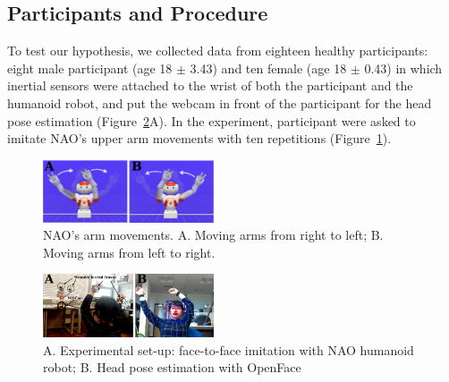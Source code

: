 \documentclass{sigchi}
\begin{document}
\subsection{Participants and Procedure}
To test our hypothesis, we collected data from eighteen healthy participants:
eight male participant (age 18 $\pm$ 3.43) and ten female (age 18 $\pm$ 0.43)
in which inertial sensors were attached to the wrist of both the participant and the
humanoid robot, and put the webcam in front of the participant for the head pose
estimation (Figure~\ref{fig:exp}A).
In the experiment, participant were asked to imitate NAO's upper arm movements
with ten repetitions (Figure~\ref{fig:nao}).
\begin{figure}
\centering
\includegraphics[width=0.45\textwidth]{figures/nao/arm_movements/fignao}
\caption[PA]{NAO's arm movements. A. Moving arms from right to left;
B. Moving arms from left to right.  }
\label{fig:nao}
\end{figure}
\begin{figure}
\centering
\includegraphics[width=0.45\textwidth]{figures/experiment/fig_w619h233_v2}
\caption[PA]{A. Experimental set-up: face-to-face imitation with NAO humanoid robot;
B. Head pose estimation with OpenFace \cite{Baltrusaitis2016} }
\label{fig:exp}
\end{figure}
\end{document}
